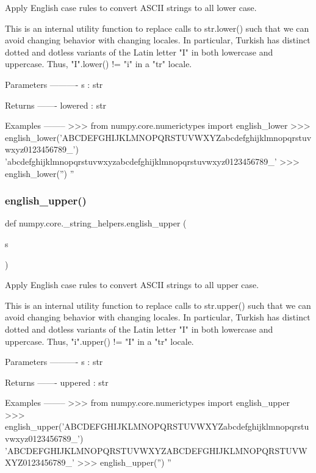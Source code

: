 \begin{DoxyVerb}Apply English case rules to convert ASCII strings to all lower case.

This is an internal utility function to replace calls to str.lower() such
that we can avoid changing behavior with changing locales. In particular,
Turkish has distinct dotted and dotless variants of the Latin letter "I" in
both lowercase and uppercase. Thus, "I".lower() != "i" in a "tr" locale.

Parameters
----------
s : str

Returns
-------
lowered : str

Examples
--------
>>> from numpy.core.numerictypes import english_lower
>>> english_lower('ABCDEFGHIJKLMNOPQRSTUVWXYZabcdefghijklmnopqrstuvwxyz0123456789_')
'abcdefghijklmnopqrstuvwxyzabcdefghijklmnopqrstuvwxyz0123456789_'
>>> english_lower('')
''
\end{DoxyVerb}
 \mbox{\label{namespacenumpy_1_1core_1_1__string__helpers_a3ff87ea2ea25d9de1f54a279dd16d329}} 
\subsubsection{\texorpdfstring{english\+\_\+upper()}{english\_upper()}}
{\footnotesize\ttfamily def numpy.\+core.\+\_\+string\+\_\+helpers.\+english\+\_\+upper (\begin{DoxyParamCaption}\item[{}]{s }\end{DoxyParamCaption})}

\begin{DoxyVerb}Apply English case rules to convert ASCII strings to all upper case.

This is an internal utility function to replace calls to str.upper() such
that we can avoid changing behavior with changing locales. In particular,
Turkish has distinct dotted and dotless variants of the Latin letter "I" in
both lowercase and uppercase. Thus, "i".upper() != "I" in a "tr" locale.

Parameters
----------
s : str

Returns
-------
uppered : str

Examples
--------
>>> from numpy.core.numerictypes import english_upper
>>> english_upper('ABCDEFGHIJKLMNOPQRSTUVWXYZabcdefghijklmnopqrstuvwxyz0123456789_')
'ABCDEFGHIJKLMNOPQRSTUVWXYZABCDEFGHIJKLMNOPQRSTUVWXYZ0123456789_'
>>> english_upper('')
''
\end{DoxyVerb}
 

